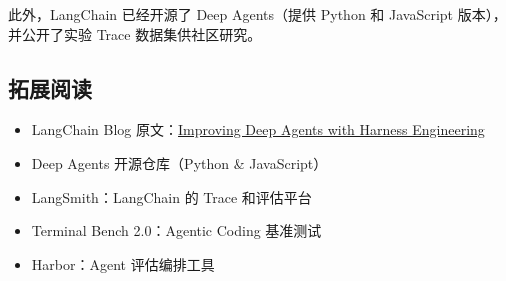 此外，LangChain 已经开源了 Deep Agents（提供 Python 和 JavaScript 版本），并公开了实验 Trace 数据集供社区研究。

\subsection{拓展阅读}

\begin{itemize}[leftmargin=1.5em]
    \item LangChain Blog 原文：\href{https://blog.langchain.com/improving-deep-agents-with-harness-engineering/}{Improving Deep Agents with Harness Engineering}
    \item Deep Agents 开源仓库（Python \& JavaScript）
    \item LangSmith：LangChain 的 Trace 和评估平台
    \item Terminal Bench 2.0：Agentic Coding 基准测试
    \item Harbor：Agent 评估编排工具
\end{itemize}



